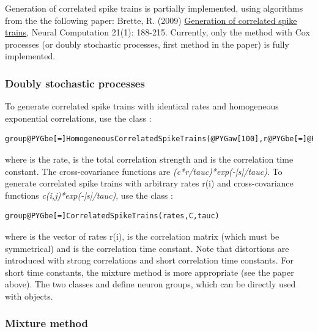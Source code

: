 \documentclass[letterpaper,10pt,english]{manual}
\begin{document}
Generation of correlated spike trains is partially implemented, using algorithms from the
the following paper: Brette, R. (2009) \href{http://www.di.ens.fr/\textasciitilde{}brette/papers/Brette2008NC.html}{Generation of correlated spike trains},
Neural Computation 21(1): 188-215. Currently, only the method with Cox processes
(or doubly stochastic processes, first method in the paper) is fully implemented.


\subsubsection{Doubly stochastic processes}

To generate correlated spike trains with identical rates and homogeneous exponential correlations,
use the class :

\begin{Verbatim}[commandchars=@\[\]]
group@PYGbe[=]HomogeneousCorrelatedSpikeTrains(@PYGaw[100],r@PYGbe[=]@PYGaw[10]@PYGbe[*]Hz,c@PYGbe[=]@PYGaw[0.1],tauc@PYGbe[=]@PYGaw[10]@PYGbe[*]ms)
\end{Verbatim}

where  is the rate,  is the total correlation strength and  is the correlation time constant.
The cross-covariance functions are \emph{(c*r/tauc)*exp(-|s|/tauc)}.
To generate correlated spike trains with arbitrary rates r(i) and
cross-covariance functions \emph{c(i,j)*exp(-|s|/tauc)}, use the class :

\begin{Verbatim}[commandchars=@\[\]]
group@PYGbe[=]CorrelatedSpikeTrains(rates,C,tauc)
\end{Verbatim}

where  is the vector of rates r(i),  is the correlation matrix (which must be
symmetrical) and  is the correlation time constant. Note that distortions are introduced
with strong correlations and short correlation time constants. For short time constants,
the mixture method is more appropriate (see the paper above).
The two classes  and 
define neuron groups, which can be directly used with \hyperlink{brian.Connection}{} objects.


\subsubsection{Mixture method}
\end{document}
